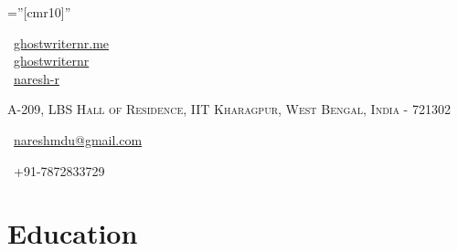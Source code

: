 \documentclass[a4paper,10pt]{extarticle} %
\begin{document}
\pagestyle{empty} %

\font\fb=''[cmr10]'' %

\begin{multicols}{3}
\normalsize  \faGlobe\ {\href{http://ghostwriternr.me/}{ghostwriternr.me}}\\
\normalsize \faGithub\ {\href{https://github.com/ghostwriternr}{ghostwriternr}}\\
\normalsize  \faLinkedinSquare\ {\href{https://www.linkedin.com/in/naresh-r-464a8b8b}{naresh-r}}\\
\columnbreak
\normalsize\par{\par} %
\par{\centering\normalsize {\textsc{A-209, LBS Hall of Residence, IIT Kharagpur, West Bengal, India - 721302}}\hfill\par}
\columnbreak
\raggedright\hfill\normalsize \faEnvelope\ {\href{mailto:nareshmdu@gmail.com}{nareshmdu@gmail.com}}\\
\raggedright\hfill{\faPhone\ +91-7872833729}
\end{multicols}


\vspace{-0.4cm}
\section{Education}
\end{document}
